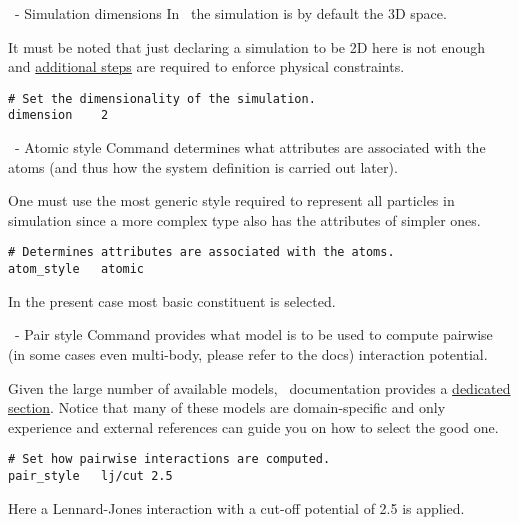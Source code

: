 \begin{frame}[fragile]{\secname}{\subsecname\ - Simulation dimensions}
In \LAMMPS\, the simulation  is by default the 3D space.

\vspace{0.5cm}

It must be noted that just declaring a simulation to be 2D here is not enough and \href{https://docs.lammps.org/Howto_2d.html}{additional steps} are required to enforce physical constraints.

\vspace{0.5cm}

\begin{lstlisting}[language=LAMMPS]
# Set the dimensionality of the simulation.
dimension    2
\end{lstlisting}
\end{frame}

\begin{frame}[fragile]{\secname}{\subsecname\ - Atomic style}
Command  determines what attributes are associated with the atoms (and thus how the system definition is carried out later).

\vspace{0.5cm}

One must use the most generic style required to represent all particles in simulation since a more complex type also has the attributes of simpler ones.

\vspace{0.5cm}

\begin{lstlisting}[language=LAMMPS]
# Determines attributes are associated with the atoms.
atom_style   atomic
\end{lstlisting}

\vspace{0.5cm}
In the present case most basic constituent  is selected.
\end{frame}

\begin{frame}[fragile]{\secname}{\subsecname\ - Pair style}
Command  provides what model is to be used to compute pairwise (in some cases even multi-body, please refer to the docs) interaction potential.

\vspace{0.5cm}

Given the large number of available models, \LAMMPS\ documentation provides a \href{https://docs.lammps.org/pairs.html}{dedicated section}. Notice that many of these models are domain-specific and only experience and external references can guide you on how to select the good one.

\vspace{0.5cm}

\begin{lstlisting}[language=LAMMPS]
# Set how pairwise interactions are computed.
pair_style   lj/cut 2.5
\end{lstlisting}

\vspace{0.5cm}
Here a Lennard-Jones interaction with a cut-off potential of 2.5 is applied.
\end{frame}

